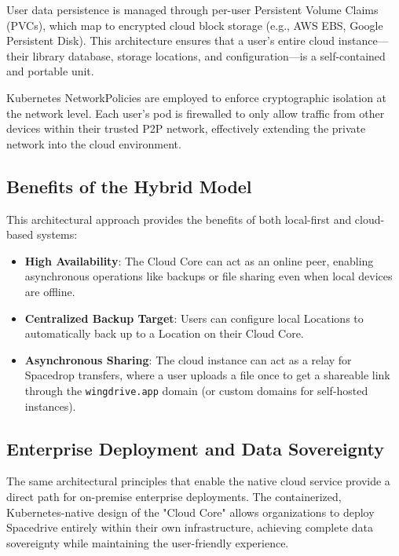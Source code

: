 \documentclass[sigconf]{acmart}
\begin{document}
User data persistence is managed through per-user Persistent Volume Claims (PVCs), which map to encrypted cloud block storage (e.g., AWS EBS, Google Persistent Disk). This architecture ensures that a user's entire cloud instance---their library database, storage locations, and configuration---is a self-contained and portable unit.

Kubernetes NetworkPolicies are employed to enforce cryptographic isolation at the network level. Each user's pod is firewalled to only allow traffic from other devices within their trusted P2P network, effectively extending the private network into the cloud environment.

\subsection{Benefits of the Hybrid Model}
This architectural approach provides the benefits of both local-first and cloud-based systems:
\begin{itemize}[noitemsep, topsep=0pt]
    \item \textbf{High Availability}: The Cloud Core can act as an online peer, enabling asynchronous operations like backups or file sharing even when local devices are offline.
    \item \textbf{Centralized Backup Target}: Users can configure local Locations to automatically back up to a Location on their Cloud Core.
    \item \textbf{Asynchronous Sharing}: The cloud instance can act as a relay for Spacedrop transfers, where a user uploads a file once to get a shareable link through the \texttt{wingdrive.app} domain (or custom domains for self-hosted instances).
\end{itemize}

\subsection{Enterprise Deployment and Data Sovereignty}
The same architectural principles that enable the native cloud service provide a direct path for on-premise enterprise deployments. The containerized, Kubernetes-native design of the "Cloud Core" allows organizations to deploy Spacedrive entirely within their own infrastructure, achieving complete data sovereignty while maintaining the user-friendly experience.
\end{document}
